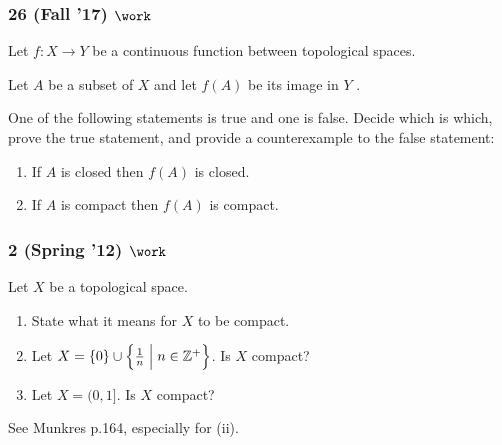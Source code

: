 \hypertarget{fall-17-work}{%
\subsubsection{\texorpdfstring{26 (Fall '17)
\(\work\)}{26 (Fall '17) \textbackslash work}}\label{fall-17-work}}

\begin{problem}[?]

Let \(f : X \to Y\) be a continuous function between topological spaces.

Let \(A\) be a subset of \(X\) and let \(f (A)\) be its image in \(Y\) .

One of the following statements is true and one is false. Decide which
is which, prove the true statement, and provide a counterexample to the
false statement:

\begin{enumerate}
\def\labelenumi{\arabic{enumi}.}
\item
  If \(A\) is closed then \(f (A)\) is closed.
\item
  If \(A\) is compact then \(f (A)\) is compact.
\end{enumerate}

\end{problem}

\hypertarget{spring-12-work}{%
\subsubsection{\texorpdfstring{2 (Spring '12)
\(\work\)}{2 (Spring '12) \textbackslash work}}\label{spring-12-work}}

\begin{problem}[?]

Let \(X\) be a topological space.

\begin{enumerate}
\def\labelenumi{\alph{enumi}.}
\item
  State what it means for \(X\) to be compact.
\item
  Let
  \(X = \left\{{0}\right\} \cup \left\{{{1\over n} \mathrel{\Big|}n \in {\mathbb{Z}}^+ }\right\}\).
  Is \(X\) compact?
\item
  Let \(X = (0, 1]\). Is \(X\) compact?
\end{enumerate}

\end{problem}


\begin{concept}

See Munkres p.164, especially for (ii).

\end{concept}

